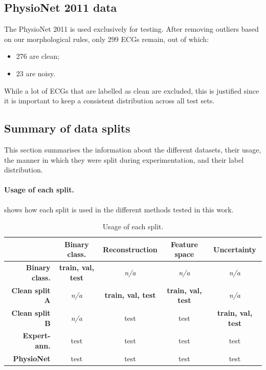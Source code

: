 \documentclass[a4paper,10pt]{article}
\begin{document}
\subsection{PhysioNet 2011 data}
\label{sec:physionet_stats}

The PhysioNet 2011 is used exclusively for testing. After removing outliers based on our morphological rules, only 299 ECGs remain, out of which:
\begin{itemize}
	\item 276 are clean;
	\item 23 are noisy.
\end{itemize}
While a lot of ECGs that are labelled as clean are excluded, this is justified since it is important to keep a consistent distribution across all test sets.


\subsection{Summary of data splits}

This section summarises the information about the different datasets, their usage, the manner in which they were split during experimentation, and their label distribution.

\paragraph{Usage of each split.}  shows how each split is used in the different methods tested in this work.
\begin{table}[htbp]
	\begin{tabular}{r|c|c|c|c}
		                       & \textbf{Binary class.}    & \textbf{Reconstruction}   & \textbf{Feature space}    & \textbf{Uncertainty}      \\ \midrule
		\textbf{Binary class.} & \textbf{train, val, test} & \emph{n/a}                & \emph{n/a}                & \emph{n/a}                \\
		\textbf{Clean split A} & \emph{n/a}                & \textbf{train, val, test} & \textbf{train, val, test} & \emph{n/a}                \\
		\textbf{Clean split B} & \emph{n/a}                & test                      & test                      & \textbf{train, val, test} \\
		\textbf{Expert-ann.}   & test                      & test                      & test                      & test                      \\
		\textbf{PhysioNet}     & test                      & test                      & test                      & test
	\end{tabular}
	\caption{Usage of each split.}
	\label{tab:data-splits-usage}
\end{table}
\end{document}
